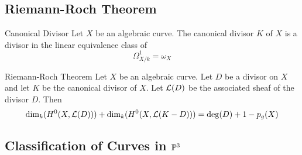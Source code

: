 \documentclass[a4paper]{article}
\begin{document}
\subsection{Riemann-Roch Theorem}
\begin{defn}{Canonical Divisor}{} Let $X$ be an algebraic curve. The canonical divisor $K$ of $X$ is a divisor in the linear equivalence class of $$\Omega_{X/k}^1=\omega_X$$
\end{defn}

\begin{thm}{Riemann-Roch Theorem}{} Let $X$ be an algebraic curve. Let $D$ be a divisor on $X$ and let $K$ be the canonical divisor of $X$. Let $\mathcal{L}(D)$ be the associated sheaf of the divisor $D$. Then $$\dim_k(H^0(X,\mathcal{L}(D)))+\dim_k(H^0(X,\mathcal{L}(K-D)))=\deg(D)+1-p_g(X)$$
\end{thm}

\subsection{Classification of Curves in $\mathbb{P}^3$}
\end{document}
